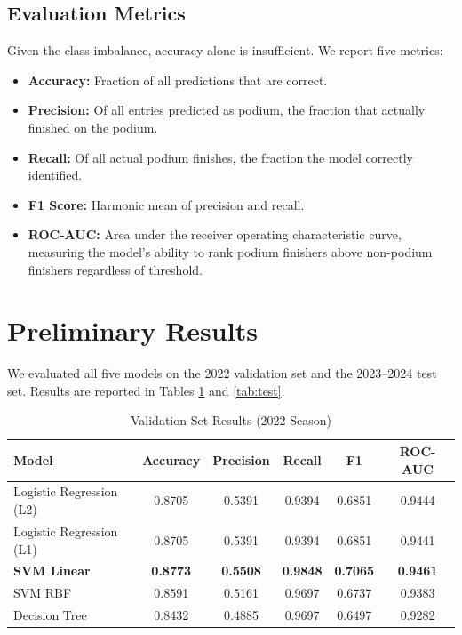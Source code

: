\documentclass[11pt]{article}
\begin{document}
\subsection{Evaluation Metrics}
 
Given the class imbalance, accuracy alone is insufficient. We report five metrics:
 
\begin{itemize}
    \item \textbf{Accuracy:} Fraction of all predictions that are correct.
    \item \textbf{Precision:} Of all entries predicted as podium, the fraction that actually finished on the podium.
    \item \textbf{Recall:} Of all actual podium finishes, the fraction the model correctly identified.
    \item \textbf{F1 Score:} Harmonic mean of precision and recall.
    \item \textbf{ROC-AUC:} Area under the receiver operating characteristic curve, measuring the model's ability to rank podium finishers above non-podium finishers regardless of threshold.
\end{itemize}

\section{Preliminary Results}

We evaluated all five models on the 2022 validation set and the 2023--2024 test set. Results are reported in Tables \ref{tab:val} and \ref{tab:test}.
 
\begin{table}[h]
\centering
\caption{Validation Set Results (2022 Season)}
\label{tab:val}
\begin{tabular}{@{}lccccc@{}}
\toprule
\textbf{Model} & \textbf{Accuracy} & \textbf{Precision} & \textbf{Recall} & \textbf{F1} & \textbf{ROC-AUC} \\
\midrule
Logistic Regression (L2) & 0.8705 & 0.5391 & 0.9394 & 0.6851 & 0.9444 \\
Logistic Regression (L1) & 0.8705 & 0.5391 & 0.9394 & 0.6851 & 0.9441 \\
\textbf{SVM Linear}       & \textbf{0.8773} & \textbf{0.5508} & \textbf{0.9848} & \textbf{0.7065} & \textbf{0.9461} \\
SVM RBF                  & 0.8591 & 0.5161 & 0.9697 & 0.6737 & 0.9383 \\
Decision Tree            & 0.8432 & 0.4885 & 0.9697 & 0.6497 & 0.9282 \\
\bottomrule
\end{tabular}
\end{table}
 
\end{document}
